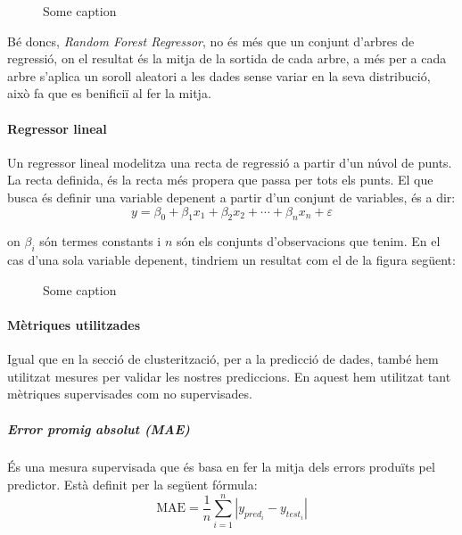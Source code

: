 \documentclass[12pt,a4paper,catalan]{article}
\begin{document}

\begin{figure}[h]
\centering
{}
\caption{Some caption}
\end{figure}

Bé doncs, \textit{Random Forest Regressor}, no és més que un conjunt d'arbres de regressió, on el resultat és la mitja de la sortida de cada arbre, a més per a cada arbre s'aplica un soroll aleatori a les dades sense variar en la seva distribució, això fa que es benificiï al fer la mitja. 

\newpage

\paragraph{Regressor lineal}
Un regressor lineal modelitza una recta de regressió a partir d'un núvol de punts. La recta definida, és la recta més propera que passa per tots els punts. El que busca és definir una variable depenent a partir d'un conjunt de variables, és a dir:
$$
y =\beta_0+\beta_1 x_1+\beta_2 x_2+ \cdots + \beta_n x_n + \varepsilon
$$

on $\beta_i$ són termes constants i $n$ són els conjunts d'observacions que tenim. En el cas d'una sola variable depenent, tindriem un resultat com el de la figura següent:

\begin{figure}[h]
\centering
{}
\caption{Some caption}
\end{figure}

\paragraph{Mètriques utilitzades}
Igual que en la secció de clusterització, per a la predicció de dades, també hem utilitzat mesures per validar les nostres prediccions. En aquest hem utilitzat tant mètriques supervisades com no supervisades.

\subparagraph{Error promig absolut (MAE)}
És una mesura supervisada que és basa en fer la mitja dels errors produïts pel predictor. Està definit per la següent fórmula:
$$ \mathrm{MAE} = \frac{1}{n}\sum_{i=1}^n \left| y_{pred_i}-y_{test_i}\right| $$
\end{document}
